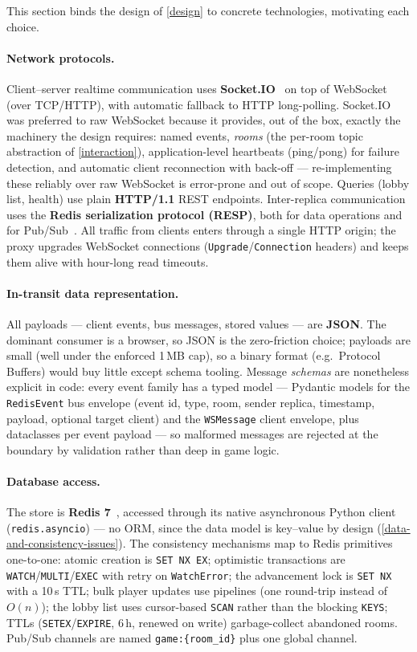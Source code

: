 \documentclass{scrartcl}
\begin{document}
This section binds the design of \cref{design} to concrete technologies,
motivating each choice.

\paragraph{Network protocols.}
Client--server realtime communication uses
\textbf{Socket.IO}~\cite{socketio} on top of WebSocket (over TCP/HTTP),
with automatic fallback to HTTP long-polling. Socket.IO was preferred to
raw WebSocket because it provides, out of the box, exactly the machinery
the design requires: named events, \emph{rooms} (the per-room topic
abstraction of \cref{interaction}), application-level heartbeats
(ping/pong) for failure detection, and automatic client reconnection with
back-off --- re-implementing these reliably over raw WebSocket is
error-prone and out of scope. Queries (lobby list, health) use plain
\textbf{HTTP/1.1} REST endpoints. Inter-replica communication uses the
\textbf{Redis serialization protocol (RESP)}, both for data operations and
for Pub/Sub~\cite{redis}. All traffic from clients enters through a single
HTTP origin; the proxy upgrades WebSocket connections
(\texttt{Upgrade}/\texttt{Connection} headers) and keeps them alive with
hour-long read timeouts.

\paragraph{In-transit data representation.}
All payloads --- client events, bus messages, stored values --- are
\textbf{JSON}. The dominant consumer is a browser, so JSON is the
zero-friction choice; payloads are small (well under the enforced 1\,MB
cap), so a binary format (e.g.\ Protocol Buffers) would buy little except
schema tooling. Message \emph{schemas} are nonetheless explicit in code:
every event family has a typed model --- Pydantic models for the
\texttt{RedisEvent} bus envelope (event id, type, room, sender replica,
timestamp, payload, optional target client) and the \texttt{WSMessage}
client envelope, plus dataclasses per event payload --- so malformed
messages are rejected at the boundary by validation rather than deep in
game logic.

\paragraph{Database access.}
The store is \textbf{Redis 7}~\cite{redis}, accessed through its native
asynchronous Python client (\texttt{redis.asyncio}) --- no ORM, since the
data model is key--value by design (\cref{data-and-consistency-issues}).
The consistency mechanisms map to Redis primitives one-to-one: atomic
creation is \texttt{SET NX EX}; optimistic transactions are
\texttt{WATCH}/\texttt{MULTI}/\texttt{EXEC} with retry on
\texttt{WatchError}; the advancement lock is \texttt{SET NX} with a 10\,s
TTL; bulk player updates use pipelines (one round-trip instead of $O(n)$);
the lobby list uses cursor-based \texttt{SCAN} rather than the blocking
\texttt{KEYS}; TTLs (\texttt{SETEX}/\texttt{EXPIRE}, 6\,h, renewed on
write) garbage-collect abandoned rooms. Pub/Sub channels are named
\texttt{game:\{room\_id\}} plus one global channel.
\end{document}
